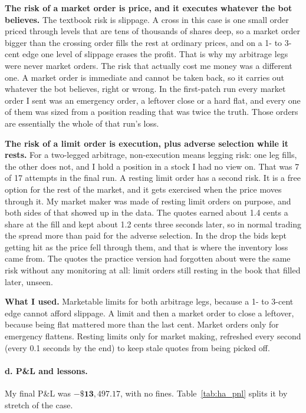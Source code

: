 \textbf{The risk of a market order is price, and it executes whatever the bot
believes.} The textbook risk is slippage. A cross in this case is one small order
priced through levels that are tens of thousands of shares deep, so a market order
bigger than the crossing order fills the rest at ordinary prices, and on a 1- to
3-cent edge one level of slippage erases the profit. That is why my arbitrage legs
were never market orders. The risk that actually cost me money was a different one.
A market order is immediate and cannot be taken back, so it carries out whatever the
bot believes, right or wrong. In the first-patch run every market order I sent was
an emergency order, a leftover close or a hard flat, and every one of them was sized
from a position reading that was twice the truth. Those orders are essentially the
whole of that run's loss.

\textbf{The risk of a limit order is execution, plus adverse selection while it
rests.} For a two-legged arbitrage, non-execution means legging risk: one leg fills,
the other does not, and I hold a position in a stock I had no view on. That was 7 of
17 attempts in the final run. A resting limit order has a second risk. It is a free
option for the rest of the market, and it gets exercised when the price moves
through it. My market maker was made of resting limit orders on purpose, and both
sides of that showed up in the data. The quotes earned about 1.4 cents a share at the
fill and kept about 1.2 cents three seconds later, so in normal trading the spread
more than paid for the adverse selection. In the drop the bids kept getting hit as
the price fell through them, and that is where the inventory loss came from. The
quotes the practice version had forgotten about were the same risk without any
monitoring at all: limit orders still resting in the book that filled later, unseen.

\textbf{What I used.} Marketable limits for both arbitrage legs, because a 1- to
3-cent edge cannot afford slippage. A limit and then a market order to close a
leftover, because being flat mattered more than the last cent. Market orders only for
emergency flattens. Resting limits only for market making, refreshed every second
(every 0.1 seconds by the end) to keep stale quotes from being picked off.

\paragraph{d. P\&L and lessons.}
My final P\&L was $\mathbf{-\$13{,}497.17}$, with no fines. Table~\ref{tab:ha_pnl}
splits it by stretch of the case.

